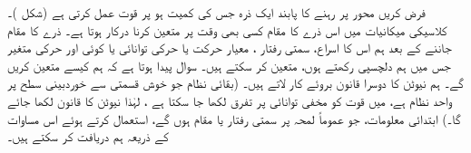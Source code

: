 فرض کریں   محور     پر رہنے کا  پابند ایک ذرہ  جس کی   کمیت   ہو  پر قوت  عمل کرتی ہے  (شکل )۔ کلاسیکی میکانیات میں اس ذرے کا مقام   کسی بھی وقت  پر  متعین کرنا درکار ہوتا ہے۔ ذرے کا مقام جاننے کے بعد ہم اس کا اسراع، سمتی رفتار  ، معیار حرکت   یا حرکی توانائی   یا کوئی اور حرکی متغیر جس میں ہم دلچسپی رکھتے ہوں،     متعین کر سکتے ہیں۔  سوال پیدا ہوتا ہے کہ ہم  کیسے متعین  کریں گے۔ ہم نیوٹن کا دوسرا قانون    بروئے کار لاتے ہیں۔ (بقائی نظام جو خوش قسمتی سے خوردبینی سطح پر واحد نظام ہے، میں قوت کو مخفی توانائی پر تفرق لکھا جا سکتا ہے ،  لہٰذا نیوٹن کا قانون   لکھا جائے گا۔)   ابتدائی معلومات، جو عموماً لمحہ  پر سمتی رفتار یا مقام ہوں گے، استعمال کرتے ہوئے    اس مساوات کے ذریعہ  ہم   دریافت کر سکتے ہیں۔
 
